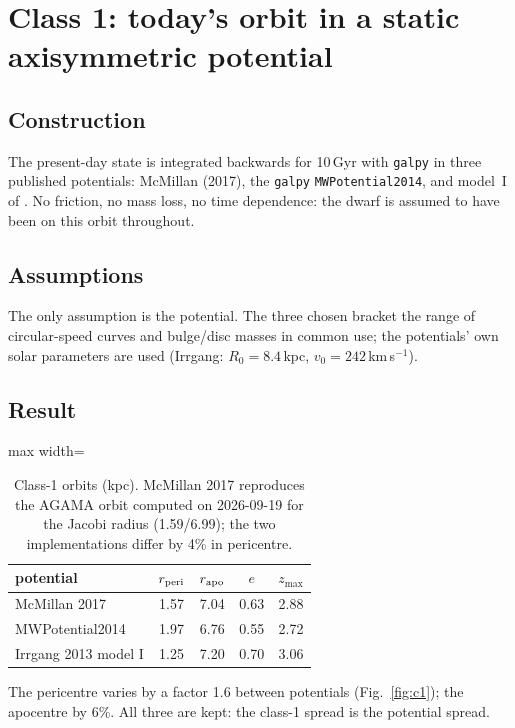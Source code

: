 \documentclass[11pt,a4paper]{article}
\newcommand{\kms}{km\,s$^{-1}$}
\begin{document}
\section{Class 1: today's orbit in a static axisymmetric potential}

\subsection{Construction}
The present-day state is integrated backwards for 10\,Gyr with \texttt{galpy}
\citep[\texttt{dop853\_c},][]{bovy2015} in three published potentials: McMillan (2017), the
\texttt{galpy} \texttt{MWPotential2014}, and model~I of \citet{irrgang2013}. No friction, no
mass loss, no time dependence: the dwarf is assumed to have been on this orbit throughout.

\subsection{Assumptions}
The only assumption is the potential. The three chosen bracket the range of circular-speed
curves and bulge/disc masses in common use; the potentials' own solar parameters are used
(Irrgang: $R_0=8.4$\,kpc, $v_0=242$\,\kms).

\subsection{Result}
\begin{table}[h]\centering
\caption{Class-1 orbits (kpc). McMillan 2017 reproduces the AGAMA orbit computed on 2026-09-19
for the Jacobi radius (1.59/6.99); the two implementations differ by 4\% in pericentre.}
\begin{adjustbox}{max width=\linewidth}
\begin{tabular}{lcccc}\toprule
potential & $r_{\rm peri}$ & $r_{\rm apo}$ & $e$ & $z_{\max}$\\\midrule
McMillan 2017 & 1.57 & 7.04 & 0.63 & 2.88\\
MWPotential2014 & 1.97 & 6.76 & 0.55 & 2.72\\
Irrgang 2013 model I & 1.25 & 7.20 & 0.70 & 3.06\\
\bottomrule\end{tabular}
\end{adjustbox}
\end{table}

The pericentre varies by a factor 1.6 between potentials (Fig.~\ref{fig:c1}); the apocentre
by 6\%. All three are kept: the class-1 spread is the potential spread.
\end{document}
